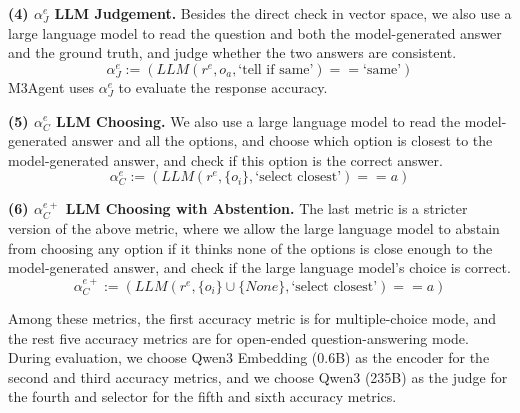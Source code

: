 \textbf{(4) $\alpha^e_J$ LLM Judgement.} Besides the direct check in vector space, we also use a large language model to read the question and both the model-generated answer and the ground truth, and judge whether the two answers are consistent.
\begin{equation}
    \alpha^e_J := (LLM(r^e, o_a, \text{`tell if same'}) == \text{`same'})
\end{equation}
M3Agent\cite{long2025M3Agent} uses $\alpha^e_J$ to evaluate the response accuracy.

\textbf{(5) $\alpha^e_C$ LLM Choosing.} We also use a large language model to read the model-generated answer and all the options, and choose which option is closest to the model-generated answer, and check if this option is the correct answer.
\begin{equation}
    \alpha^e_C := (LLM(r^e, \{o_i\}, \text{`select closest'}) == a)
\end{equation}

\textbf{(6) $\alpha^{e+}_C$ LLM Choosing with Abstention.} The last metric is a stricter version of the above metric, where we allow the large language model to abstain from choosing any option if it thinks none of the options is close enough to the model-generated answer, and check if the large language model's choice is correct.
\begin{equation}
    \alpha^{e+}_C := (LLM(r^e, \{o_i\} \cup \{None\}, \text{`select closest'}) == a)
\end{equation}




Among these metrics, the first accuracy metric is for multiple-choice mode, and the rest five accuracy metrics are for open-ended question-answering mode.
During evaluation, we choose Qwen3 Embedding (0.6B) as the encoder for the second and third accuracy metrics, and we choose Qwen3 (235B) as the judge for the fourth and selector for the fifth and sixth accuracy metrics.

